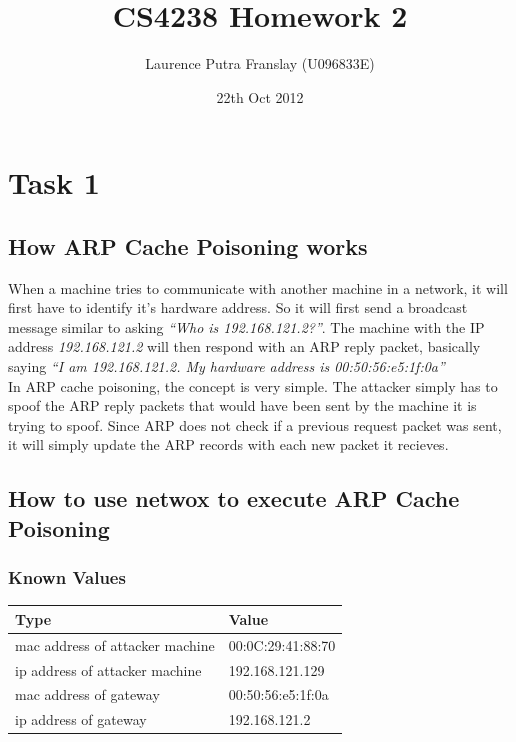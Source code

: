 \documentclass[12pt]{article}
\begin{document}
\title{CS4238 Homework 2}
\author{Laurence Putra Franslay (U096833E)}
\date{22th Oct 2012}
\maketitle

\section{Task 1}
\subsection{How ARP Cache Poisoning works}
When a machine tries to communicate with another machine in a network, it will first have to identify it's hardware address. So it will first send a broadcast message similar to asking \emph{``Who is 192.168.121.2?''}. The machine with the IP address \emph{192.168.121.2} will then respond with an ARP reply packet, basically saying \emph{``I am 192.168.121.2. My hardware address is 00:50:56:e5:1f:0a''}\\


In ARP cache poisoning, the concept is very simple. The attacker simply has to spoof the ARP reply packets that would have been sent by the machine it is trying to spoof. Since ARP does not check if a previous request packet was sent, it will simply update the ARP records with each new packet it recieves. \\

\subsection{How to use netwox to execute ARP Cache Poisoning}
\subsubsection{Known Values}
\begin{table}[here]
\centering
\begin{tabularx}{0.7\textwidth}{ | l | X | }
\hline
Type								&	Value \\
\hline
mac address of attacker machine		&	00:0C:29:41:88:70\\
\hline
ip address of attacker machine		& 	192.168.121.129\\
\hline
mac address of gateway				&	00:50:56:e5:1f:0a\\
\hline
ip address of gateway				& 	192.168.121.2\\
\hline
\end{tabularx}
\end{table}
\end{document}
